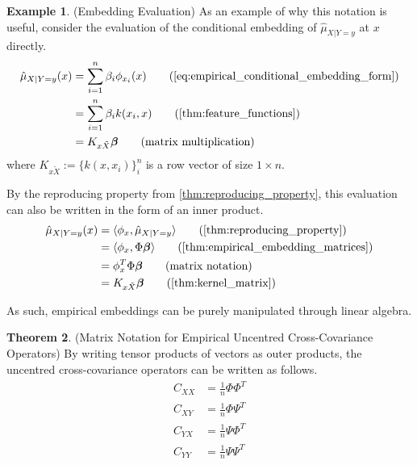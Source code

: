 \documentclass[twoside]{article} \usepackage{aistats2017}
\theoremstyle{definition}
\newtheorem{theorem}{Theorem}[section]
\newtheorem{example}[theorem]{Example}
\newcommand{\rv}[1]{{#1}}
\newcommand{\ds}[1]{\tilde{#1}}
\newcommand{\inner}[2]{{\langle #1, #2 \rangle}}
\newcommand{\hatmuXy}{\hat{\mu}_{\rv{X} | \rv{Y} = y}}
\newcommand{\hatCxy}{\hat{C}_{\rv{X} \rv{Y}}}
\newcommand{\hatCyx}{\hat{C}_{\rv{Y} \rv{X}}}
\newcommand{\hatCxx}{\hat{C}_{\rv{X} \rv{X}}}
\newcommand{\hatCyy}{\hat{C}_{\rv{Y} \rv{Y}}}
\begin{document}
		\begin{example} \label{ex:embedding_evaluation}
			(Embedding Evaluation)
			As an example of why this notation is useful, consider the evaluation of the conditional embedding of $\hatmuXy$ at $x$ directly.
			\begin{align*}
				\hatmuXy(x) &= \sum_{i = 1}^{n} \beta_{i} \phi_{x_{i}}(x) \tag{\cref{eq:empirical_conditional_embedding_form}} \\
				&= \sum_{i = 1}^{n} \beta_{i} k(x_{i}, x) \tag{\cref{thm:feature_functions}} \\
				&= K_{x \ds{X}} \bm{\beta} \tag{matrix multiplication}
			\end{align*}
			where $K_{x \ds{X}} := \{k(x, x_{i})\}_{i}^{n}$ is a row vector of size $1 \times n$.
			
			By the reproducing property from \cref{thm:reproducing_property}, this evaluation can also be written in the form of an inner product.
			\begin{align*}
				\hatmuXy(x) &= \inner{\phi_{x}}{\hatmuXy} \tag{\cref{thm:reproducing_property}}\\
				&= \inner{\phi_{x}}{\Phi \bm{\beta}} \tag{\cref{thm:empirical_embedding_matrices}}\\
				&= \phi_{x}^{T} \Phi \bm{\beta} \tag{matrix notation} \\
				&= K_{x \ds{X}} \bm{\beta} \tag{\cref{thm:kernel_matrix}}
			\end{align*}
			
			As such, empirical embeddings can be purely manipulated through linear algebra.
		\end{example}
		
		\begin{theorem} \label{thm:empirical_cross_cov_matrices}
			(Matrix Notation for Empirical Uncentred Cross-Covariance Operators)
			By writing tensor products of vectors as outer products, the uncentred cross-covariance operators can be written as follows.
			\begin{equation}
			\begin{aligned}
				\hatCxx &= \frac{1}{n} \Phi \Phi^{T} \\
				\hatCxy &= \frac{1}{n} \Phi \Psi^{T} \\
				\hatCyx &= \frac{1}{n} \Psi \Phi^{T} \\
				\hatCyy &= \frac{1}{n} \Psi \Psi^{T}
			\label{eq:empirical_cross_cov_matrices}
			\end{aligned}
			\end{equation}
		\end{theorem}
		
\end{document}
